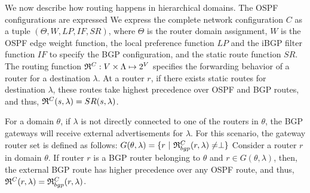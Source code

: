  We now describe how routing
happens in hierarchical domains. 
The OSPF configurations are expressed 
We express the complete network configuration $C$
as a tuple $(\Theta,W,LP,IF,SR)$, where $\Theta$ is
the router domain assignment, $W$ is the OSPF
edge weight function,
the local preference function $LP$  
and the iBGP filter function $IF$ to specify
the BGP configuration, and the static route
function $SR$.  The routing function 
$\mathfrak{R}^C: V \times \Lambda \mapsto 2^V$ 
specifies the forwarding
behavior of a router for a destination $\lambda$.  
At a router $r$, if there exists 
static routes for destination $\lambda$,
these routes take highest precedence over OSPF and BGP routes, 
and thus, $\mathfrak{R}^C(s, \lambda) = SR(s, \lambda)$.

For a domain $\theta$, if $\lambda$ is not directly 
connected to one of the routers in $\theta$, the BGP 
gateways will receive external advertisements for $\lambda$.
For this scenario, the gateway router set is defined as follows: 
$G(\theta, \lambda) = \{r ~|~ \mathfrak{R}^C_{bgp}(r, \lambda) \not= \perp\}$
Consider a router $r$ in domain $\theta$. 
If router $r$ is a BGP router belonging to $\theta$ and $r \in G (\theta, \lambda)$, then, the external BGP route has higher
precedence over any OSPF route, and thus, $\mathfrak{R}^C(r, \lambda)=\mathfrak{R}^C_{bgp}(r, \lambda)$. 

